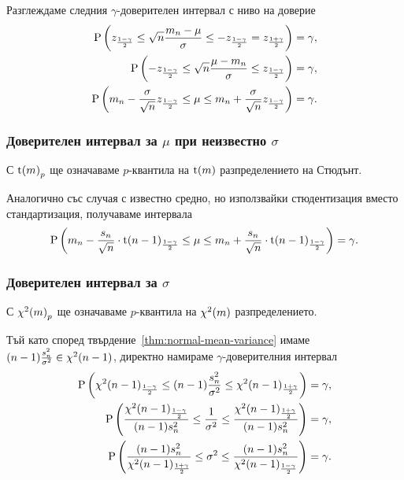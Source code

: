 \documentclass[numbers=endperiod, DIV=15, bibliography=totocnumbered]{scrartcl}
\begin{document}
Разглеждаме следния $\gamma$-доверителен интервал с ниво на доверие
\begin{align*}
  \operatorname{P} \left( z_{\frac {1-\gamma} 2} \leq \sqrt n \frac {m_n - \mu} \sigma \leq -z_{\frac {1-\gamma} 2} = z_{\frac {1+\gamma} 2} \right) &= \gamma,
  \\
  \operatorname{P} \left( -z_{\frac {1-\gamma} 2} \leq \sqrt n \frac {\mu - m_n} \sigma \leq z_{\frac {1-\gamma} 2} \right) &= \gamma,
  \\
  \operatorname{P} \left( m_n - \frac \sigma {\sqrt n} z_{\frac {1-\gamma} 2} \leq \mu \leq m_n + \frac \sigma {\sqrt n} z_{\frac {1-\gamma} 2} \right) &= \gamma.
\end{align*}

\subsubsection{Доверителен интервал за $\mu$ при неизвестно $\sigma$}

С ${\operatorname{t}(m)}_p$ ще означаваме $p$-квантила на $\operatorname{t}(m)$ разпределението на Стюдънт.

Аналогично със случая с известно средно, но използвайки стюдентизация вместо стандартизация, получаваме интервала
\begin{displaymath}
  \operatorname{P} \left( m_n - \frac {s_n} {\sqrt n} \cdot {\operatorname{t}(n-1)}_{\frac {1-\gamma} 2} \leq \mu \leq m_n + \frac {s_n} {\sqrt n} \cdot {\operatorname{t}(n-1)}_{\frac {1-\gamma} 2} \right) = \gamma.
\end{displaymath}

\subsubsection{Доверителен интервал за $\sigma$}

С ${\operatorname{\chi^2}(m)}_p$ ще означаваме $p$-квантила на $\operatorname{\chi^2}(m)$ разпределението.

Тъй като според твърдение~\ref{thm:normal-mean-variance} имаме $(n-1) \frac {s_n^2} {\sigma^2} \in \operatorname{\chi^2}(n-1)$, директно намираме $\gamma$-доверителния интервал
\begin{align*}
  \operatorname{P} \left( {\operatorname{\chi^2}(n-1)}_{\frac {1-\gamma} 2} \leq (n-1) \frac {s_n^2} {\sigma^2} \leq {\operatorname{\chi^2}(n-1)}_{\frac {1+\gamma} 2} \right) &= \gamma,
  \\
  \operatorname{P} \left( \frac {{\operatorname{\chi^2}(n-1)}_{\frac {1-\gamma} 2}} {(n-1) s_n^2} \leq \frac 1 {\sigma^2} \leq \frac {{\operatorname{\chi^2}(n-1)}_{\frac {1+\gamma} 2}} {(n-1) s_n^2} \right) &= \gamma,
  \\
  \operatorname{P} \left( \frac {(n-1) s_n^2} {{\operatorname{\chi^2}(n-1)}_{\frac {1+\gamma} 2}} \leq \sigma^2 \leq \frac {(n-1) s_n^2} {{\operatorname{\chi^2}(n-1)}_{\frac {1-\gamma} 2}} \right) &= \gamma.
\end{align*}

\printbibliography
\end{document}
